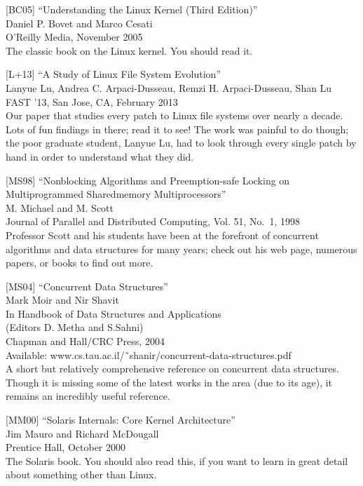 {[}BC05{]} ``Understanding the Linux Kernel (Third Edition)''\\
Daniel P. Bovet and Marco Cesati\\
O'Reilly Media, November 2005\\
The classic book on the Linux kernel. You should read it.

{[}L+13{]} ``A Study of Linux File System Evolution''\\
Lanyue Lu, Andrea C. Arpaci-Dusseau, Remzi H. Arpaci-Dusseau, Shan Lu\\
FAST '13, San Jose, CA, February 2013\\
Our paper that studies every patch to Linux file systems over nearly a
decade. Lots of fun findings in there; read it to see! The work was
painful to do though; the poor graduate student, Lanyue Lu, had to look
through every single patch by hand in order to understand what they did.

{[}MS98{]} ``Nonblocking Algorithms and Preemption-safe Locking on
Multiprogrammed Sharedmemory Multiprocessors''\\
M. Michael and M. Scott\\
Journal of Parallel and Distributed Computing, Vol. 51, No.~1, 1998\\
Professor Scott and his students have been at the forefront of
concurrent algorithms and data structures for many years; check out his
web page, numerous papers, or books to find out more.

{[}MS04{]} ``Concurrent Data Structures''\\
Mark Moir and Nir Shavit\\
In Handbook of Data Structures and Applications\\
(Editors D. Metha and S.Sahni)\\
Chapman and Hall/CRC Press, 2004\\
Available: www.cs.tau.ac.il/˜shanir/concurrent-data-structures.pdf\\
A short but relatively comprehensive reference on concurrent data
structures. Though it is missing some of the latest works in the area
(due to its age), it remains an incredibly useful reference.

{[}MM00{]} ``Solaris Internals: Core Kernel Architecture''\\
Jim Mauro and Richard McDougall\\
Prentice Hall, October 2000\\
The Solaris book. You should also read this, if you want to learn in
great detail about something other than Linux.

